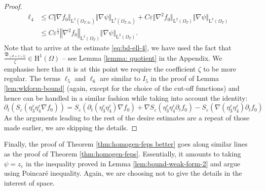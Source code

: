 \documentclass[preprint, 12pt]{amsart}
\numberwithin{equation}{section}
\numberwithin{equation}{section}
\newcommand{\eps}{\varepsilon}
\begin{document}
\begin{proof}
\begin{equation}\label{eq:bd-ell-4}
\begin{aligned}
\ell_4 & \leq C  \Vert \nabla f_0 \Vert_{\mathrm L^2(\Omega_{T,3\eps})} \Vert \nabla \psi \Vert_{\mathrm L^2(\Omega_{T,3\eps})} 
+ C \eps \Vert \nabla^2 f_0 \Vert_{\mathrm L^2(\Omega_T)} \Vert \nabla \psi \Vert_{\mathrm L^2(\Omega_T)}
\\
& \le C \eps^\frac12 \left\Vert \nabla^2 f_0 \right\Vert_{\mathrm L^2(\Omega_T)} \Vert \nabla \psi \Vert_{\mathrm L^2(\Omega_T)}.
\end{aligned}
\end{equation}
Note that to arrive at the estimate \eqref{eq:bd-ell-4}, we have used the fact that $\frac{\mathfrak{B}_{(d+1)ij}}{\zeta}\in \mathrm H^1(\Omega)$ -- see Lemma \ref{lemma: quotient} in the Appendix. We emphasise here that it is at this point we require the coefficient $\zeta$ to be more regular. The terms $\ell_5$ and $\ell_6$ are similar to $I_5$ in the proof of Lemma \ref{lem:wkform-bound} (again, except for the choice of the cut-off functions) and hence can be handled in a similar fashion while taking into account the identity:
\begin{equation*}
\partial_t \left( S_\eps\left(\eta^\eps_3 \eta^\eps_4 \nabla f_0\right) \right) 
= S_{\eps}(\partial_t(\eta^\eps_3 \eta^\eps_4) \nabla f_0) 
+ \nabla S_{\eps}\left(\eta^\eps_3 \eta^\eps_4\partial_t f_0\right) - S_\eps\left(\nabla \left(\eta^\eps_3 \eta^\eps_4\right) \partial_t f_0\right)
\end{equation*}
As the arguments leading to the rest of the  desire estimates are a repeat of those made earlier, we are skipping the details.
\end{proof}

Finally, the proof of Theorem \ref{thm:homogen-feps better} goes along similar lines as the proof of Theorem \ref{thm:homogen-feps}. Essentially, it amounts to taking $\psi=z_\eps$ in the inequality proved in Lemma \ref{lem:bound-weak-form-2} and argue using Poincar\'e inequality. Again, we are choosing not to give the details in the interest of space.
\end{document}
